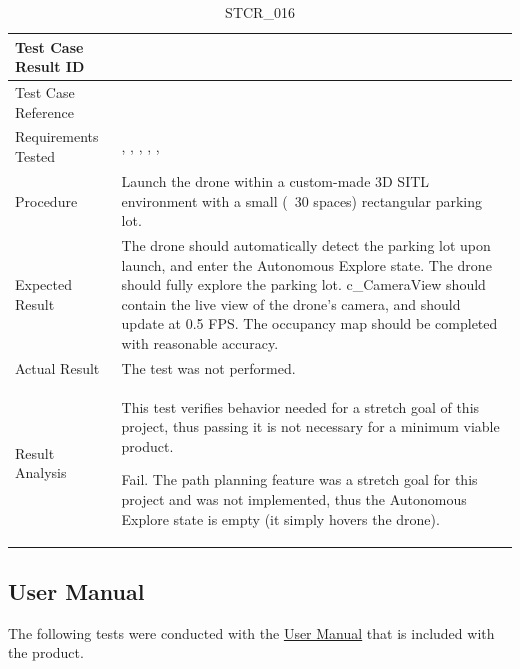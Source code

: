 \documentclass[12pt, titlepage]{article}
\begin{document}
\begin{table}[!h]
\begin{center}
\caption {STCR\_016}
\label{tab:STCR_016}
\begin{tabular}{ | m{3.2cm} | m{12.2cm} | } 
\hline
Test Case Result ID & \nameref{tab:STCR_016} \\ 
\hline
Test Case Reference & \nameref{tab:STC_016}  \\ 
\hline
Requirements Tested & \nameref{GEN_001}, \nameref{GEN_002}, \nameref{GEN_005}, \nameref{GEN_006}, \nameref{STA_003}, \nameref{TRANS_003}
\\ 
\hline
Procedure & Launch the drone within a custom-made 3D SITL environment with a small (~30 spaces) rectangular parking lot.  \\
\hline
Expected Result & The drone should automatically detect the parking lot upon launch, and enter the Autonomous Explore state. The drone should fully explore the parking lot. c\_CameraView should contain the live view of the drone's camera, and should update at 0.5 FPS. The occupancy map should be completed with reasonable accuracy.  \\ 
\hline
Actual Result &  The test was not performed. \\
\hline
Result Analysis & This test verifies behavior needed for a stretch goal of this project, thus passing it is not necessary for a minimum viable product. 

Fail. The path planning feature was a stretch goal for this project and was not implemented, thus the Autonomous Explore state is empty (it simply hovers the drone).    \\ 
\hline
\end{tabular}
\end{center}
\end{table}

\clearpage

\subsection{User Manual}
The following tests were conducted with the \href{https://github.com/icecap360/DroneCapstone/blob/master/docs/UserManual/UserManual.pdf}{User Manual} that is included with the product.
\end{document}
